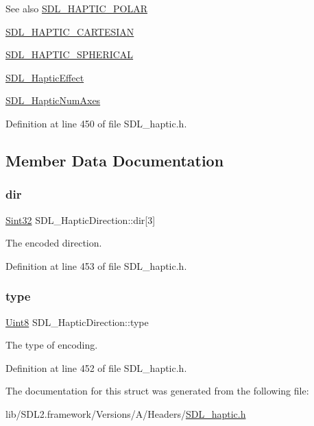 \begin{DoxySeeAlso}{See also}
\mbox{\hyperlink{_s_d_l__haptic_8h_acdc35e97e5525472054a67b76e518f3b}{S\+D\+L\+\_\+\+H\+A\+P\+T\+I\+C\+\_\+\+P\+O\+L\+AR}} 

\mbox{\hyperlink{_s_d_l__haptic_8h_af8b2430a363a968de2a5b64c8f663d3b}{S\+D\+L\+\_\+\+H\+A\+P\+T\+I\+C\+\_\+\+C\+A\+R\+T\+E\+S\+I\+AN}} 

\mbox{\hyperlink{_s_d_l__haptic_8h_a1fcf7cb0eaf3c39b16ba266054e25aff}{S\+D\+L\+\_\+\+H\+A\+P\+T\+I\+C\+\_\+\+S\+P\+H\+E\+R\+I\+C\+AL}} 

\mbox{\hyperlink{union_s_d_l___haptic_effect}{S\+D\+L\+\_\+\+Haptic\+Effect}} 

\mbox{\hyperlink{_s_d_l__haptic_8h_ad6705645197f6df4eeeea32392462483}{S\+D\+L\+\_\+\+Haptic\+Num\+Axes}} 
\end{DoxySeeAlso}


Definition at line 450 of file S\+D\+L\+\_\+haptic.\+h.



\subsection{Member Data Documentation}
\mbox{\label{struct_s_d_l___haptic_direction_a6cebd8118a3e61e36bd0c503ae020362}} 
\subsubsection{\texorpdfstring{dir}{dir}}
{\footnotesize\ttfamily \mbox{\hyperlink{_s_d_l__stdinc_8h_a7a90b941db9d4582e9ad7abb9940ff7e}{Sint32}} S\+D\+L\+\_\+\+Haptic\+Direction\+::dir\mbox{[}3\mbox{]}}

The encoded direction. 

Definition at line 453 of file S\+D\+L\+\_\+haptic.\+h.

\mbox{\label{struct_s_d_l___haptic_direction_acd6830ad68c4ba2af16057fa418087cc}} 
\subsubsection{\texorpdfstring{type}{type}}
{\footnotesize\ttfamily \mbox{\hyperlink{_s_d_l__stdinc_8h_a2944638813a090aa23e62f4da842c3e2}{Uint8}} S\+D\+L\+\_\+\+Haptic\+Direction\+::type}

The type of encoding. 

Definition at line 452 of file S\+D\+L\+\_\+haptic.\+h.



The documentation for this struct was generated from the following file\+:\begin{DoxyCompactItemize}
\item 
lib/\+S\+D\+L2.\+framework/\+Versions/\+A/\+Headers/\mbox{\hyperlink{_s_d_l__haptic_8h}{S\+D\+L\+\_\+haptic.\+h}}\end{DoxyCompactItemize}
